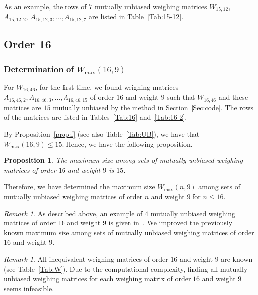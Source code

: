 \documentclass[12pt]{article}
\newtheorem{prop}[thm]{Proposition}
\theoremstyle{remark}
\newtheorem{rem}[thm]{Remark}
\begin{document}
As an example, the rows of $7$ mutually unbiased weighing matrices 
$W_{15,12}$, $A_{15,12,2}$, $A_{15,12,3},\ldots,A_{15,12,7}$
are listed in Table~\ref{Tab:15-12}.


\subsection{Order 16}
\subsubsection{Determination of  $W_{\max}(16,9)$}


For $W_{16,46}$, for the first time,
we found weighing matrices 
$A_{16,46,2},A_{16,46,3},\ldots, A_{16,46,15}$
of order $16$ and weight $9$ 
such that $W_{16,46}$ and these matrices are $15$ mutually unbiased
by the method in Section~\ref{Sec:code}.
The rows of the matrices are listed in Tables~\ref{Tab:16} and~\ref{Tab:16-2}.


By Proposition~\ref{prop:f} (see also Table~\ref{Tab:UB}), 
we have that $W_{\max}(16,9) \le 15$.
Hence, we have the following proposition.

\begin{prop}\label{prop:16}
The maximum size among sets of mutually
unbiased weighing matrices of order $16$ and weight $9$ is $15$.
\end{prop}

Therefore, we have determined the maximum size  $W_{\max}(n,9)$ among sets of mutually
unbiased weighing matrices of order $n$ and weight $9$ for $n \le 16$.

\begin{rem}
As described above,
an example of $4$ mutually unbiased weighing matrices of order $16$ and
weight $9$ is given in~\cite{HKO}.
We improved the previously known maximum size among sets of mutually
unbiased weighing matrices of order $16$ and weight $9$.
\end{rem}


\begin{rem}
All inequivalent weighing matrices of order $16$ and weight $9$ are known (see Table~\ref{Tab:W}).
Due to the computational complexity,
finding all mutually
unbiased weighing matrices for each weighing matrix of order $16$ and weight $9$ 
seems infeasible. 
\end{rem}
\end{document}
